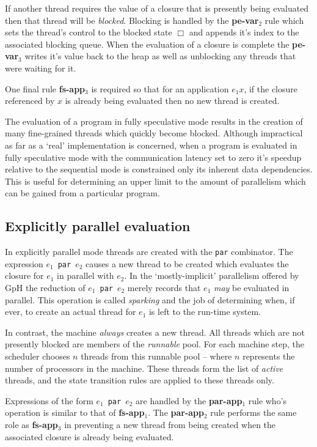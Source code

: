 \documentclass{llncs}
\begin{document}
If another thread requires the value of a closure that is presently being evaluated then that thread will be \emph{blocked}. Blocking is handled by the \textbf{pe-var$_2$} rule which sets the thread's control to the blocked state $\Box$ and appends it's index to the associated blocking queue. When the evaluation of a closure is complete the \textbf{pe-var$_3$} writes it's value back to the heap as well as unblocking any threads that were waiting for it.

One final rule \textbf{fs-app$_3$} is required so that for an application $e_1 x$, if the closure referenced by $x$ is already being evaluated then no new thread is created.

\bigskip
\noindent
The evaluation of a program in fully speculative mode results in the creation of many fine-grained threads which quickly become blocked. Although impractical as far as a `real' implementation is concerned, when a program is evaluated in fully speculative mode with the communication latency set to zero it's speedup relative to the sequential mode is constrained only its inherent data dependencies. This is useful for determining an upper limit to the amount of parallelism which can be gained from a particular program.


\subsection{Explicitly parallel evaluation}
In explicitly parallel mode threads are created with the \texttt{par} combinator. The expression \mbox{$e_1$ \texttt{par} $e_2$} causes a new thread to be created which evaluates the closure for $e_1$ in parallel with $e_2$. In the `mostly-implicit' parallelism offered by GpH the reduction of \mbox{$e_1$ \texttt{par} $e_2$} merely records that $e_1$ \emph{may} be evaluated in parallel. This operation is called \emph{sparking} and the job of determining when, if ever, to create an actual thread for $e_1$ is left to the run-time system.

In contrast, the \ample machine \emph{always} creates a new thread. All threads which are not presently blocked are members of the \emph{runnable} pool. For each machine step, the scheduler chooses $n$ threads from this runnable pool -- where $n$ represents the number of processors in the machine. These threads form the list of \emph{active} threads, and the state transition rules are applied to these threads only.

Expressions of the form \mbox{$e_1$ \texttt{par} $e_2$} are handled by the \textbf{par-app$_1$} rule who's operation is similar to that of \textbf{fs-app$_1$}. The \textbf{par-app$_2$} rule performs the same role as \textbf{fs-app$_3$} in preventing a new thread from being created when the associated closure is already being evaluated. 
\end{document}
